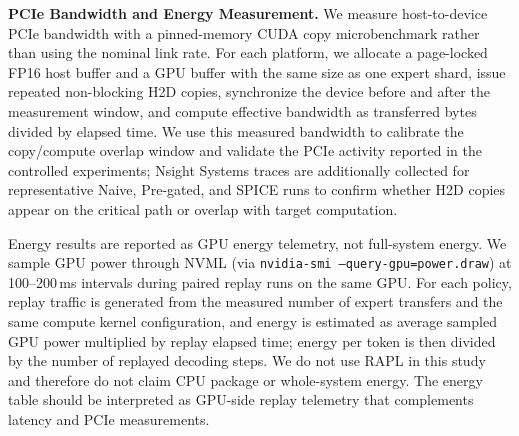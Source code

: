 
\textbf{PCIe Bandwidth and Energy Measurement.}
We measure host-to-device PCIe bandwidth with a pinned-memory CUDA copy
microbenchmark rather than using the nominal link rate. For each platform, we
allocate a page-locked FP16 host buffer and a GPU buffer with the same size as
one expert shard, issue repeated non-blocking H2D copies, synchronize the
device before and after the measurement window, and compute effective bandwidth
as transferred bytes divided by elapsed time. We use this measured bandwidth to
calibrate the copy/compute overlap window and validate the PCIe activity
reported in the controlled experiments; Nsight Systems traces are additionally
collected for representative Naive, Pre-gated, and SPICE runs to confirm
whether H2D copies appear on the critical path or overlap with target
computation.

Energy results are reported as GPU energy telemetry, not full-system energy. We
sample GPU power through NVML (via
\texttt{nvidia-smi --query-gpu=power.draw}) at 100--200\,ms intervals during
paired replay runs on the same GPU. For each policy, replay traffic is
generated from the measured number of expert transfers and the same compute
kernel configuration, and energy is estimated as average sampled GPU power
multiplied by replay elapsed time; energy per token is then divided by the
number of replayed decoding steps. We do not use RAPL in this study and
therefore do not claim CPU package or whole-system energy. The energy table
should be interpreted as GPU-side replay telemetry that complements latency and
PCIe measurements.
